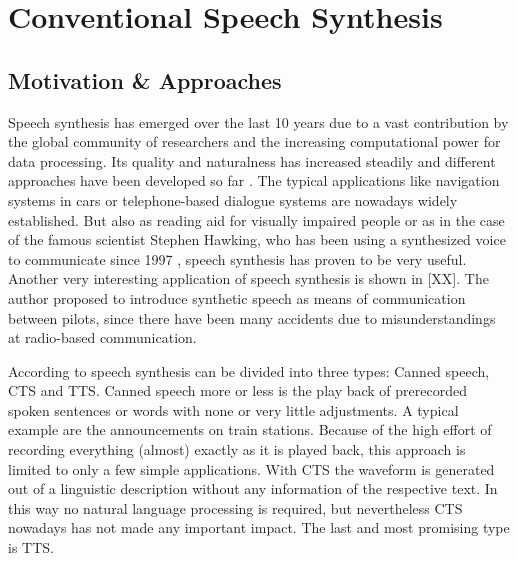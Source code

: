

\section{Conventional Speech Synthesis}
\label{sec:speech}

\subsection{Motivation \& Approaches}
\label{subsec:convenspeech}

Speech synthesis has emerged over the last 10 years due to a vast contribution by the global community of researchers and the increasing computational power for data processing. Its quality and naturalness has increased steadily and different approaches have been developed so far \cite{suendermann:challenges}. The typical applications like navigation systems in cars or telephone-based dialogue systems are nowadays widely established. But also as reading aid for visually impaired people \cite{readspeaker:tts} or as in the case of the famous scientist Stephen Hawking, who has been using a synthesized voice to communicate since 1997 \cite{hawking:speech}, speech synthesis has proven to be very useful. Another very interesting application of speech synthesis is shown in [XX]. The author proposed to introduce synthetic speech as means of communication between pilots, since there have been many accidents due to misunderstandings at radio-based communication. %

According to \cite{hinterleitner:quality} speech synthesis can be divided into three types: Canned speech, \ac{CTS} and \ac{TTS}. Canned speech more or less is the play back of prerecorded spoken sentences or words with none or very little adjustments. A typical example are the announcements on train stations. Because of the high effort of recording everything (almost) exactly as it is played back, this approach is limited to only a few simple applications. With \ac{CTS} the waveform is generated out of a linguistic description without any information of the respective text. In this way no natural language processing is required, but nevertheless \ac{CTS} nowadays has not made any important impact. The last and most promising type is \ac{TTS}.

